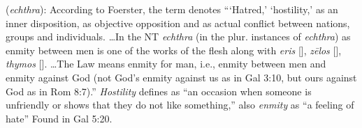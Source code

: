 \item[Hostility,]

(\textit{echthra}):
According to Foerster, the term denotes ```Hatred,' `hostility,' as an inner disposition, as objective opposition and as actual conflict between nations, groups and individuals. \ldots In the NT \emph{echthra} (in the plur. instances of \emph{echthra}) as enmity between men is one of the works of the flesh along with \emph{eris} [], \emph{zēlos} [], \emph{thymos} []. \ldots The Law means enmity for man, i.e., enmity between men and enmity against God (not God's enmity against us as in Gal 3:10, but ours against God as in Rom 8:7).'' 
\emph{Hostility} defines as ``an occasion when someone is unfriendly or shows that they do not like something,'' also \emph{enmity} as ``a feeling of hate''
Found in Gal 5:20.
